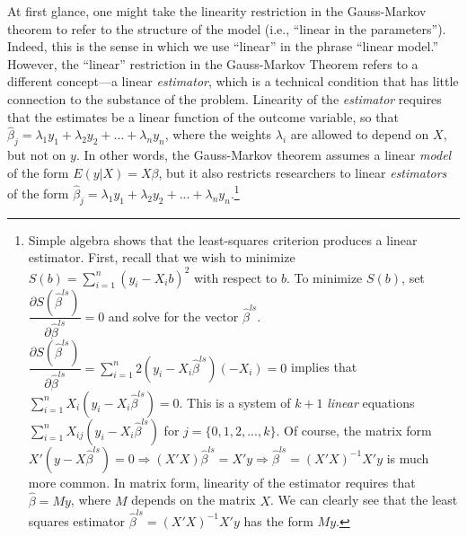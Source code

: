 \documentclass[12pt]{article}
\begin{document}
At first glance, one might take the linearity restriction in the Gauss-Markov theorem to refer to the structure of the model (i.e., ``linear in the parameters''). 
Indeed, this is the sense in which we use ``linear'' in the phrase ``linear model.'' 
However, the ``linear'' restriction in the Gauss-Markov Theorem refers to a different concept---a linear \textit{estimator}, which is a technical condition that has little connection to the substance of the problem.
Linearity of the \textit{estimator} requires that the estimates be a linear function of the outcome variable, so that $\hat{\beta}_j = \lambda_1 y_1 + \lambda_2 y_2 + ... + \lambda_n y_n$, where the weights $\lambda_i$ are allowed to depend on $X$, but not on $y$. 
In other words, the Gauss-Markov theorem assumes a linear \textit{model} of the form $E(y | X) = X\beta$, but it also restricts researchers to linear \textit{estimators} of the form $\hat{\beta}_j = \lambda_1 y_1 + \lambda_2 y_2 + ... + \lambda_n y_n$.\footnote{Simple algebra shows that the least-squares criterion produces a linear estimator. 
First, recall that we wish to minimize $S(b) = \sum_{i = 1}^n(y_i - X_ib)^2$ with respect to $b$. 
To minimize $S(b)$, set $\dfrac{\partial S(\hat{\beta}^{ls})}{\partial \hat{\beta}^{ls}} = 0$ and solve for the vector $\hat{\beta}^{ls}$. 
$\dfrac{\partial S(\hat{\beta}^{ls})}{\partial \hat{\beta}^{ls}} = \sum_{i = 1}^n 2(y_i - X_i\hat{\beta}^{ls})(-X_i) = 0$ implies that $\sum_{i = 1}^n X_i(y_i - X_i\hat{\beta}^{ls}) = 0$. 
This is a system of $k+1$ \textit{linear} equations $\sum_{i = 1}^n X_{ij}(y_i - X_i\hat{\beta}^{ls})$ for $j = \{0, 1, 2,..., k\}$. 
Of course, the matrix form $X'(y - X\hat{\beta}^{ls}) = 0 \Rightarrow (X'X)\hat{\beta}^{ls} = X'y \Rightarrow \hat{\beta}^{ls} = (X'X)^{-1}X'y$ is much more common. 
In matrix form, linearity of the estimator requires that $\hat{\beta} = My$, where $M$ depends on the matrix $X$. 
We can clearly see that the least squares estimator $\hat{\beta}^{ls} = (X'X)^{-1}X'y$ has the form $My$.}
\end{document}
